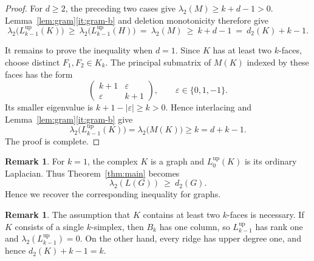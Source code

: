 \documentclass[11pt,reqno]{amsart}
\numberwithin{equation}{section}
\theoremstyle{plain}
\theoremstyle{definition}
\newtheorem{remark}[theorem]{Remark}
\newcommand{\Lup}{L^{\mathrm{up}}}
\newcommand{\eps}{\varepsilon}
\begin{document}
\begin{proof}
\medskip
\noindent

For $d\ge2$, the preceding two cases give $\lambda_2(M)\ge k+d-1>0$.
Lemma~\ref{lem:gram}\ref{it:gram-b} and deletion monotonicity therefore give
\[
  \lambda_2\bigl(\Lup_{k-1}(K)\bigr)
  \ \ge\ \lambda_2\bigl(\Lup_{k-1}(H)\bigr)
  \ =\ \lambda_2(M)
  \ \ge\ k+d-1
  \ =\ d_2(K)+k-1 .
\]

\medskip
It remains to prove the inequality when $d=1$. Since $K$ has at least two $k$-faces, choose
distinct $F_1,F_2\in K_k$. The
principal submatrix of $M(K)$ indexed by these faces has the form
\[
  \begin{pmatrix}k+1&\eps\\ \eps&k+1\end{pmatrix},
  \qquad \eps\in\{0,1,-1\}.
\]
Its smaller eigenvalue is $k+1-|\eps|\ge k>0$. Hence interlacing and
Lemma~\ref{lem:gram}\ref{it:gram-b} give
\[
  \lambda_2\bigl(\Lup_{k-1}(K)\bigr)
  =\lambda_2\bigl(M(K)\bigr)\ge k=d+k-1 .
\]
The proof is complete.
\end{proof}

\begin{remark}
For $k=1$, the complex $K$ is a graph and $\Lup_0(K)$ is its ordinary Laplacian. Thus
Theorem~\ref{thm:main} becomes
\[
  \lambda_2(L(G))\ \ge\ d_2(G) .
\]
Hence we recover the corresponding inequality for graphs.
\end{remark}

\begin{remark}
The assumption that $K$ contains at least two $k$-faces is necessary. If $K$ consists of a
single $k$-simplex, then $B_k$ has one column, so $\Lup_{k-1}$ has rank one and
$\lambda_2(\Lup_{k-1})=0$. On the other hand, every ridge has upper degree one, and hence
$d_2(K)+k-1=k$.
\end{remark}
\end{document}
